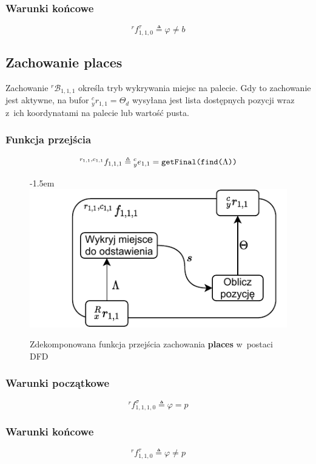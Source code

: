 \subsubsection{Warunki końcowe}
\begin{equation}
    {}^{r}f^{\tau}_{1,1,0} \triangleq \varphi \neq b
\end{equation}

\subsection{Zachowanie places}
\label{subsec:vr-camera-places}
Zachowanie ${}^{r}\mathcal{B}_{1,1,1}$ określa tryb wykrywania miejsc na palecie. Gdy to zachowanie jest aktywne, na bufor ${}^{c}_{y}r_{1,1} = \Theta_{d}$ wysyłana jest lista dostępnych pozycji wraz z~ich koordynatami na palecie lub wartość pusta. 

\subsubsection{Funkcja przejścia}
\begin{equation}
    {}^{r_{1,1}, c_{1,1}}f_{1,1,1} \triangleq {}^{c}_{y}e_{1,1} = \text{\texttt{getFinal(find(}}\Lambda\text{\texttt{))}}  
\end{equation}

\begin{figure}[ht]
    \leftskip-1.5em
    \includegraphics[width=\columnwidth]{figures/ISR-vr-camera-fp-places.pdf}
    \label{fig:vr-camera-fp-places}
    \caption{Zdekomponowana funkcja przejścia zachowania \textbf{places} w~postaci DFD}
\end{figure}

\subsubsection{Warunki początkowe}
\begin{equation}
    {}^{r}f^{\sigma}_{1,1,1,0} \triangleq \varphi = p
\end{equation}

\subsubsection{Warunki końcowe}
\begin{equation}
    {}^{r}f^{\tau}_{1,1,0} \triangleq \varphi \neq p
\end{equation}
